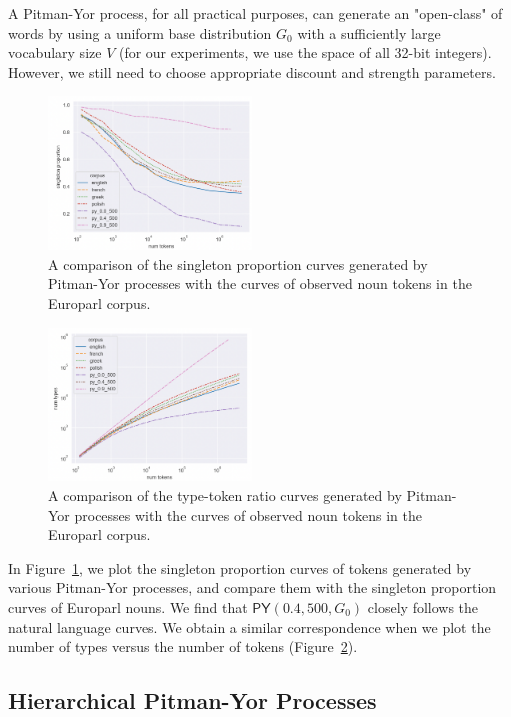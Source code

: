 \documentclass[11pt]{article}
\begin{document}
A Pitman-Yor process, for all practical purposes, can generate an "open-class" of words by using a uniform base distribution $G_0$ with a sufficiently large vocabulary size $V$ (for our experiments, we use the space of all 32-bit integers). However, we still need to choose appropriate discount and strength parameters.

\begin{figure}[t]
\centering
\includegraphics[width=0.48\textwidth]{images/sp2.png}
\caption{A comparison of the singleton proportion curves generated by Pitman-Yor processes with the curves of observed noun tokens in the Europarl corpus.}
\label{fig:sp2}
\end{figure}

\begin{figure}[t]
\centering
\includegraphics[width=0.48\textwidth]{images/type_token2.png}
\caption{A comparison of the type-token ratio curves generated by Pitman-Yor processes with the curves of observed noun tokens in the Europarl corpus.}
\label{fig:type_token2}
\end{figure}


In Figure~\ref{fig:sp2}, we plot the singleton proportion curves of tokens generated by various Pitman-Yor processes, and compare them with the singleton proportion curves of Europarl nouns. We find that $\mathsf{PY}(0.4, 500, G_0)$ closely follows the natural language curves. We obtain a similar correspondence when we plot the number of types versus the number of tokens (Figure~\ref{fig:type_token2}).


\subsection{Hierarchical Pitman-Yor Processes}
\end{document}
